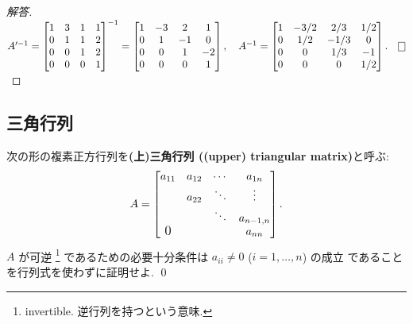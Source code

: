 \documentclass[12pt,twoside]{jarticle}
\newcommand\commentout[1]{#1}
\newcommand\commentout[1]{}
\begin{document}
\commentout{{\small
\begin{proof}[解答]
  \quad\(
    A'^{-1} =
    \begin{bmatrix}
      1 & 3 & 1 & 1 \\
      0 & 1 & 1 & 2 \\
      0 & 0 & 1 & 2 \\
      0 & 0 & 0 & 1 \\
    \end{bmatrix}^{-1}
    =
    \begin{bmatrix}
      1 & -3 &  2 &  1 \\
      0 &  1 & -1 &  0 \\
      0 &  0 &  1 & -2 \\
      0 &  0 &  0 &  1 \\
    \end{bmatrix},
    \quad
    A^{-1} =
    \begin{bmatrix}
      1 & -3/2 &  2/3 &  1/2 \\
      0 &  1/2 & -1/3 &   0 \\
      0 &   0  &  1/3 &  -1 \\
      0 &   0  &   0  &  1/2 \\
    \end{bmatrix}.
    \qed
  \)
\end{proof}
}}


\subsection{三角行列}

\begin{question}[三角行列]
  \label{q:tri-mat}
  次の形の複素正方行列を{\bf (上)三角行列 ((upper) triangular matrix)}と呼ぶ:
  \begin{equation*}
    A = 
    \begin{bmatrix}
      a_{11} & a_{12} & \cdots & a_{1n} \\
             & a_{22} & \ddots & \vdots \\
             &        & \ddots & a_{n-1,n} \\
      \smash{\hbox{\large 0}} &     &        & a_{nn} \\
    \end{bmatrix}.
  \end{equation*}
  $A$ が可逆%
  \footnote{invertible. 逆行列を持つという意味.}%
  であるための必要十分条件は $a_{ii}\ne 0$ ($i=1,\ldots,n$) の成立
  であることを行列式を使わずに証明せよ. \qed
\end{question}
\end{document}

